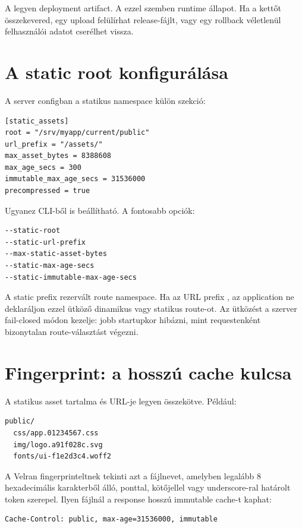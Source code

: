 A  legyen deployment artifact. A  ezzel szemben runtime állapot. Ha a kettőt összekevered, egy upload felülírhat release-fájlt, vagy egy rollback véletlenül felhasználói adatot cserélhet vissza.

\section{A static root konfigurálása}

A server configban a statikus namespace külön szekció:

\begin{lstlisting}
[static_assets]
root = "/srv/myapp/current/public"
url_prefix = "/assets/"
max_asset_bytes = 8388608
max_age_secs = 300
immutable_max_age_secs = 31536000
precompressed = true
\end{lstlisting}

Ugyanez CLI-ből is beállítható. A fontosabb opciók:

\begin{lstlisting}
--static-root
--static-url-prefix
--max-static-asset-bytes
--static-max-age-secs
--static-immutable-max-age-secs
\end{lstlisting}

A static prefix rezervált route namespace. Ha az URL prefix , az application ne deklaráljon ezzel ütköző dinamikus vagy statikus route-ot. Az ütközést a szerver fail-closed módon kezelje: jobb startupkor hibázni, mint requestenként bizonytalan route-választást végezni.

\section{Fingerprint: a hosszú cache kulcsa}

A statikus asset tartalma és URL-je legyen összekötve. Például:

\begin{lstlisting}
public/
  css/app.01234567.css
  img/logo.a91f028c.svg
  fonts/ui-f1e2d3c4.woff2
\end{lstlisting}

A Velran fingerprinteltnek tekinti azt a fájlnevet, amelyben legalább 8 hexadecimális karakterből álló, ponttal, kötőjellel vagy underscore-ral határolt token szerepel. Ilyen fájlnál a response hosszú immutable cache-t kaphat:

\begin{lstlisting}
Cache-Control: public, max-age=31536000, immutable
\end{lstlisting}

